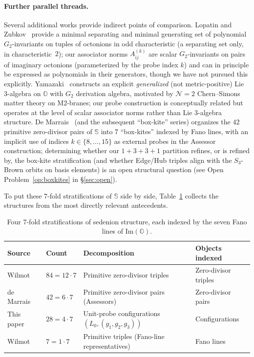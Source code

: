 \documentclass[12pt,a4paper]{article}
\begin{document}
\paragraph{Further parallel threads.}
Several additional works provide indirect points of comparison.
Lopatin and Zubkov~\cite{lopatin_zubkov2024} provide a minimal separating and minimal generating set of polynomial $G_2$-invariants on tuples of octonions in odd characteristic (a separating set only, in characteristic~$2$); our associator norms $A^{(k)}_{ij}$ are scalar $G_2$-invariants on pairs of imaginary octonions (parameterized by the probe index $k$) and can in principle be expressed as polynomials in their generators, though we have not pursued this explicitly.
Yamazaki~\cite{yamazaki2008} constructs an explicit \emph{generalized} (not metric-positive) Lie 3-algebra on $\mathbb{O}$ with $G_2$ derivation algebra, motivated by $\mathcal{N}=2$ Chern--Simons matter theory on M2-branes; our probe construction is conceptually related but operates at the level of scalar associator norms rather than Lie 3-algebra structure.
De Marrais~\cite{de_marrais2000, de_marrais2004} (and the subsequent ``box-kite'' series) organizes the 42 primitive zero-divisor pairs of $\mathbb{S}$ into 7 ``box-kites'' indexed by Fano lines, with an implicit use of indices $k \in \{8, \ldots, 15\}$ as external probes in the Assessor construction; determining whether our $1+3+3+1$ partition refines, or is refined by, the box-kite stratification (and whether Edge/Hub triples align with the $S_3$-Brown orbits on basis elements) is an open structural question (see Open Problem~\ref{op:boxkites} in \S\ref{sec:open}).

To put these 7-fold stratifications of $\mathbb{S}$ side by side, Table~\ref{tab:stratifications} collects the structures from the most directly relevant antecedents.

\begin{table}[h]
\centering
\caption{Four 7-fold stratifications of sedenion structure, each indexed by the seven Fano lines of $\mathrm{Im}(\mathbb{O})$.}
\label{tab:stratifications}
\begin{tabular}{l|l|l|l}
\toprule
Source & Count & Decomposition & Objects indexed \\
\midrule
Wilmot~\cite{wilmot2025structure} & $84 = 12 \cdot 7$ & Primitive zero-divisor triples & Zero-divisor triples \\
de Marrais~\cite{de_marrais2000} & $42 = 6 \cdot 7$ & Primitive zero-divisor pairs (Assessors) & Zero-divisor pairs \\
This paper & $28 = 4 \cdot 7$ & Unit-probe configurations $(L_0, (g_1, g_2, g_3))$ & Configurations \\
Wilmot~\cite{wilmot2025structure} & $7 = 1 \cdot 7$ & Primitive triples (Fano-line representatives) & Fano lines \\
\bottomrule
\end{tabular}
\end{table}
\end{document}
